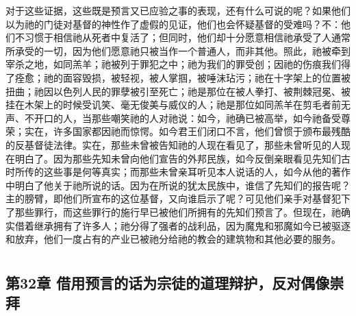 对于这些证据，这些既是预言又已应验之事的表现，还有什么可说的呢？如果他们以为祂的门徒对基督的神性作了虚假的见证，他们也会怀疑基督的受难吗？不：他们不习惯于相信祂从死者中复活了；但同时，他们却十分愿意相信祂承受了人通常所承受的一切，因为他们愿意祂只被当作一个普通人，而非其他。照此，祂被牵到宰杀之地，如同羔羊；祂被列于罪犯之中；祂为我们的罪受创；因祂的伤痕我们得了痊愈；祂的面容毁损，被轻视，被人掌掴，被唾沫玷污；祂在十字架上的位置被扭曲；祂因以色列人民的罪孽被引至死亡；祂是那位在被人拳打、被荆棘冠冕、被挂在木架上的时候受讥笑、毫无俊美与威仪的人；祂是那位如同羔羊在剪毛者前无声、不开口的人，当那些嘲笑祂的人对祂说：如今，祂确已被高举，如今祂备受尊荣；实在，许多国家都因祂而惊愕。如今君王们闭口不言，他们曾惯于颁布最残酷的反基督徒法律。实在，那些未曾被告知祂的人现在看见了，那些未曾听见的人现在明白了。因为那些先知未曾向他们宣告的外邦民族，如今反倒亲眼看见先知们古时所传的这些事是何等真实；而那些未曾亲耳听见本人说话的人，如今从他的著作中明白了他关于祂所说的话。因为在所说的犹太民族中，谁信了先知们的报告呢？主的膀臂，即他们所宣布的这位基督，又向谁启示了呢？可见他们亲手对基督犯下了那些罪行，而这些罪行的施行早已被他们所拥有的先知们预言了。但现在，祂确实借着继承拥有了许多人；祂分得了强者的战利品，因为魔鬼和邪魔如今已被驱逐和放弃，他们一度占有的产业已被祂分给祂的教会的建筑物和其他必要的服务。\par



\section{}


\subsection{第32章 借用预言的话为宗徒的道理辩护，反对偶像崇拜}

